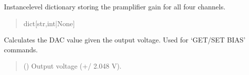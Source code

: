 \documentclass[letterpaper,10pt,english]{sphinxmanual}
\begin{document}
\begin{fulllineitems}
\begin{fulllineitems}
\begin{quote}
\begin{description}
\end{description}\end{quote}

\end{fulllineitems}


\begin{fulllineitems}
\label{\detokenize{PodApi.Devices:PodApi.Devices.PodDevice_8401HR.Pod8401HR._preampGain}}
\pysigstartsignatures
{}
\pysigstopsignatures
\sphinxAtStartPar
Instance\sphinxhyphen{}level dictionary storing the pramplifier gain for             all four channels.
\begin{quote}\begin{description}
\sphinxAtStartPar
dict{[}str,int|None{]}

\end{description}\end{quote}

\end{fulllineitems}


\begin{fulllineitems}
\label{\detokenize{PodApi.Devices:PodApi.Devices.PodDevice_8401HR.Pod8401HR.CalculateBiasDAC_GetDACValue}}
\pysigstartsignatures
{}
\pysigstopsignatures
\sphinxAtStartPar
Calculates the DAC value given the output voltage. Used for ‘GET/SET BIAS’ commands.
\begin{quote}\begin{description}
\sphinxAtStartPar
{} (\sphinxstyleliteralemphasis{\sphinxupquote{ | }}) \textendash{} Output voltage (+/\sphinxhyphen{} 2.048 V).


\end{description}
\end{quote}
\end{fulllineitems}
\end{fulllineitems}
\end{document}
